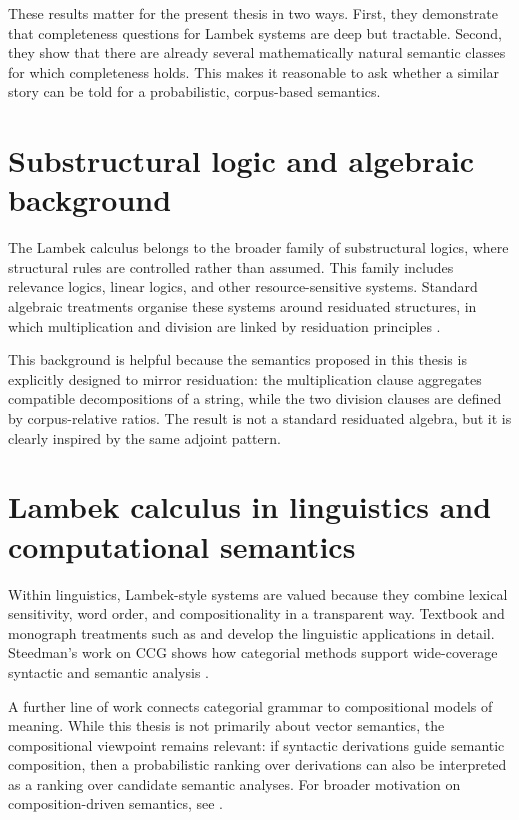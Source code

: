 \documentclass[12pt,a4paper]{report}
\theoremstyle{definition}
\begin{document}
These results matter for the present thesis in two ways. First, they demonstrate that
completeness questions for Lambek systems are deep but tractable. Second, they show that
there are already several mathematically natural semantic classes for which completeness holds.
This makes it reasonable to ask whether a similar story can be told for a probabilistic,
corpus-based semantics.

\section{Substructural logic and algebraic background}
The Lambek calculus belongs to the broader family of substructural logics, where structural
rules are controlled rather than assumed. This family includes relevance logics, linear logics, and
other resource-sensitive systems. Standard algebraic treatments organise these systems around
residuated structures, in which multiplication and division are linked by residuation principles
\citep{GalatosJipsenKowalskiOno2007,DosenSchroederHeister1993}.

This background is helpful because the semantics proposed in this thesis is explicitly designed to
mirror residuation: the multiplication clause aggregates compatible decompositions of a string,
while the two division clauses are defined by corpus-relative ratios. The result is not a standard
residuated algebra, but it is clearly inspired by the same adjoint pattern.

\section{Lambek calculus in linguistics and computational semantics}
Within linguistics, Lambek-style systems are valued because they combine lexical sensitivity,
word order, and compositionality in a transparent way. Textbook and monograph treatments
such as \citet{Morrill1994} and \citet{Moortgat1997} develop the linguistic applications in detail.
Steedman's work on CCG shows how categorial methods support wide-coverage syntactic and
semantic analysis \citep{Steedman2000}.

A further line of work connects categorial grammar to compositional models of meaning. While
this thesis is not primarily about vector semantics, the compositional viewpoint remains relevant:
if syntactic derivations guide semantic composition, then a probabilistic ranking over derivations
can also be interpreted as a ranking over candidate semantic analyses. For broader motivation on
composition-driven semantics, see \citet{CoeckeSadrzadehClark2010}.
\end{document}
